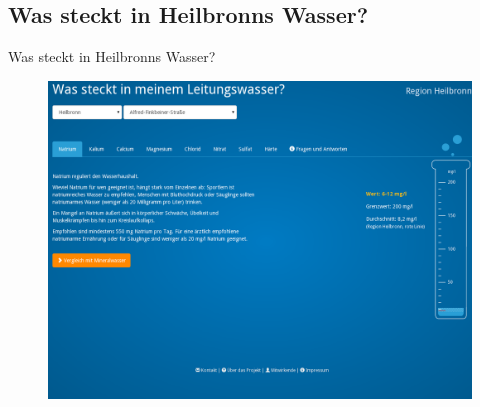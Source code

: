 \subsection{Was steckt in Heilbronns Wasser?}
\begin{frame}[t]{Was steckt in Heilbronns Wasser?}
\begin{figure}[h]
 \centering
 \includegraphics[scale=0.21]{section_other_ok_labs_water_quality.png}
\end{figure}
\end{frame}

